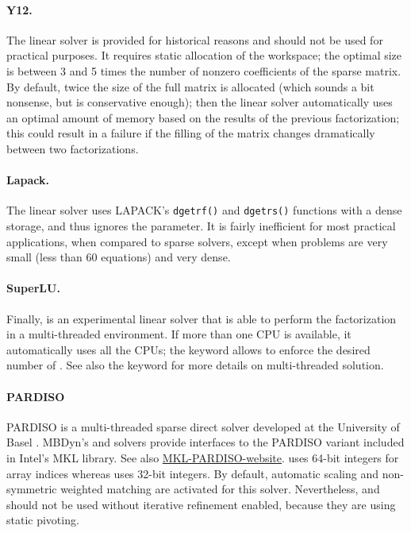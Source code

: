 \paragraph{Y12.}
The  linear solver is provided for historical reasons
and should not be used for practical purposes.
It requires static allocation of the workspace;
the optimal size  is between 3 and 5 times
the number of nonzero coefficients of the sparse matrix.
By default, twice the size of the full matrix is allocated
(which sounds a bit nonsense, but is conservative enough);
then the linear solver automatically uses an optimal amount of memory
based on the results of the previous factorization; this could
result in a failure if the filling of the matrix changes 
dramatically between two factorizations.

\paragraph{Lapack.}
The  linear solver uses LAPACK's \texttt{dgetrf()}
and \texttt{dgetrs()} functions with a dense storage,
and thus ignores the  parameter.
It is fairly inefficient for most practical applications,
when compared to sparse solvers, except when problems are very small
(less than 60 equations) and very dense.

\paragraph{SuperLU.}
Finally,  is an experimental linear solver that is able to perform
the factorization in a multi-threaded environment.
If more than one CPU is available, it automatically uses all the CPUs;
the keyword  allows to enforce the desired number of .
See also the  keyword for more details on multi-threaded
solution.

\paragraph{PARDISO}
PARDISO is a multi-threaded sparse direct solver developed at the University of Basel \cite{SCHENK2004475}.
MBDyn's  and  solvers provide interfaces to the PARDISO variant included in Intel's MKL library.
See also \href{https://www.intel.com/content/www/us/en/docs/onemkl/developer-reference-c/2023-1/onemkl-pardiso-parallel-direct-sparse-solver-iface.html}{MKL-PARDISO-website}.
 uses 64-bit integers for array indices whereas  uses 32-bit integers.
By default, automatic scaling and non-symmetric weighted matching are activated for this solver.
Nevertheless,  and  should not be used without iterative refinement enabled, because they are using static pivoting.

